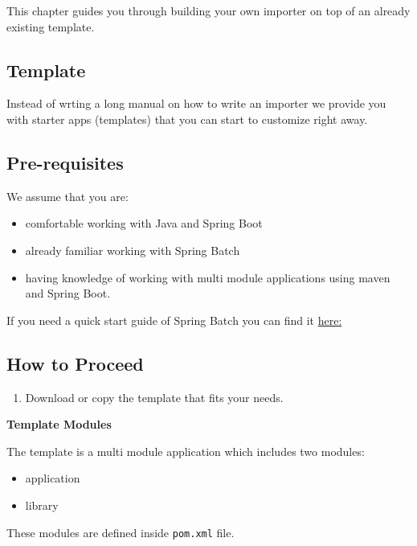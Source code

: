 \documentclass{llncs}
\providecommand{\tightlist}{%
  \setlength{\itemsep}{0pt}\setlength{\parskip}{0pt}}
\begin{document}
\begin{thebibliography}{}
This chapter guides you through building your own importer on top of an
already existing template.

\subsection{Template}\label{template}

Instead of wrting a long manual on how to write an importer we provide
you with starter apps (templates) that you can start to customize right
away.

\subsection{Pre-requisites}\label{pre-requisites}

We assume that you are:

\begin{itemize}
\tightlist
\item
  comfortable working with Java and Spring Boot
\item
  already familiar working with Spring Batch
\item
  having knowledge of working with multi module applications using maven
  and Spring Boot.
\end{itemize}

If you need a quick start guide of Spring Batch you can find it
\href{https://projects.spring.io/spring-batch/}{here:}

\subsection{How to Proceed}\label{how-to-proceed}

\begin{enumerate}
\def\labelenumi{\arabic{enumi}.}
\tightlist
\item
  Download or copy the template that fits your needs. 
\end{enumerate}

\textbf{Template Modules}

The template is a multi module application which includes two modules:

\begin{itemize}
\tightlist
\item
  application
\item
  library
\end{itemize}

These modules are defined inside \texttt{pom.xml} file.


\end{thebibliography}
\end{document}
